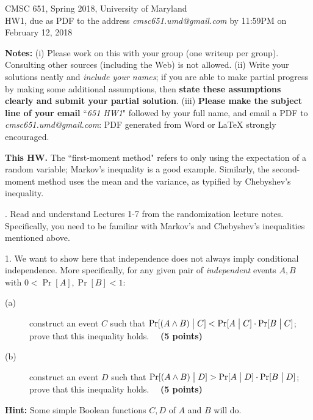 \documentclass{article}[11pt]
\begin{document}
\newcommand{\E}{\textbf{E}}
\newcommand{\var}{\textbf{var}}

\begin{center}
CMSC 651, Spring 2018, University of Maryland \\
HW1, due as PDF to the address \emph{cmsc651.umd@gmail.com} by 11:59PM on February 12, 2018
\end{center}

\medskip \noindent
\textbf{Notes:} (i) Please work on this with your group (one writeup per group). Consulting
other sources (including the Web) is not allowed. 
(ii) Write your solutions neatly and \emph{include your names}; if you are able to make partial progress by making some
additional assumptions, then \textbf{state these assumptions clearly and submit
your partial solution}. 
(iii) \textbf{Please make the subject line of your email} ``\textit{651 HW1}" followed by
your full name, and email a PDF to \emph{cmsc651.umd@gmail.com}: PDF generated from Word or LaTeX strongly encouraged. 

 \medskip \noindent \textbf{This HW.} The ``first-moment method" refers to only using the expectation of a random variable;
Markov's inequality is a good example. Similarly, the second-moment method uses the mean and the variance, as typified by Chebyshev's inequality. 

\medskip \smallskip {}. Read and understand Lectures 1-7 from the randomization lecture notes. Specifically, you need to be familiar with Markov's and Chebyshev's inequalities mentioned above. 

\medskip \noindent

1. We want to show here that independence does not always imply conditional independence. More specifically, for any given pair of \emph{independent} events $A, B$ with $0 < \Pr[A], \Pr[B] < 1$:
\begin{description}
\item[(a)] construct  an event $C$ such that $\Pr[(A \wedge B) \bigm| C] < \Pr[A \bigm| C] \cdot \Pr[B \bigm| C]$; prove that this inequality holds. ~~\textbf{(5 points)} 
\item[(b)] construct an event $D$ such that $\Pr[(A \wedge B) \bigm| D] > \Pr[A \bigm| D] \cdot \Pr[B \bigm| D]$; prove that this inequality holds. ~~\textbf{(5 points)} 
\end{description}
\noindent \textbf{Hint:} Some simple Boolean functions $C, D$ of $A$ and $B$ will do. 
\end{document}
